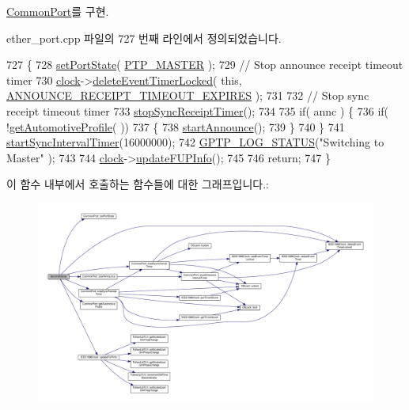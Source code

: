 \hyperlink{class_common_port_a03b0297c9770e83706826350b2815bc1}{Common\+Port}를 구현.



ether\+\_\+port.\+cpp 파일의 727 번째 라인에서 정의되었습니다.


\begin{DoxyCode}
727                                         \{
728     \hyperlink{class_common_port_a8e4a7a3f199cde3540ed0d1ab10386e5}{setPortState}( \hyperlink{ptptypes_8hpp_a679431f1afc75d7bb9e972c022e53672ab4c763cac238b6403615a62111b64aa4}{PTP\_MASTER} );
729     \textcolor{comment}{// Stop announce receipt timeout timer}
730     \hyperlink{class_common_port_aa2bc8731fa5aeb5b033feebc2b67258c}{clock}->\hyperlink{class_i_e_e_e1588_clock_ab3079a65b0509eeb40c2828fa6a7834a}{deleteEventTimerLocked}( \textcolor{keyword}{this}, 
      \hyperlink{ieee1588_8hpp_a5667b805d857c6d28f83f6038a0272d3a7060ecc9be507f5c8828eedf6a163c8b}{ANNOUNCE\_RECEIPT\_TIMEOUT\_EXPIRES} );
731 
732     \textcolor{comment}{// Stop sync receipt timeout timer}
733     \hyperlink{class_common_port_af3b46893f10141406c791c89d3e54b8d}{stopSyncReceiptTimer}();
734 
735     \textcolor{keywordflow}{if}( annc ) \{
736         \textcolor{keywordflow}{if}( !\hyperlink{class_common_port_ad8dc4b5a985b466538d6805970eb0176}{getAutomotiveProfile}( ))
737         \{
738             \hyperlink{class_common_port_a3119c85c0521ef3f23b4a2419684a015}{startAnnounce}();
739         \}
740     \}
741     \hyperlink{class_common_port_a2033d126c19548eb5ada2d623667e1f2}{startSyncIntervalTimer}(16000000);
742     \hyperlink{gptp__log_8hpp_a9bcf107d6f77d335b92bbc4825ea85a3}{GPTP\_LOG\_STATUS}(\textcolor{stringliteral}{"Switching to Master"} );
743 
744     \hyperlink{class_common_port_aa2bc8731fa5aeb5b033feebc2b67258c}{clock}->\hyperlink{class_i_e_e_e1588_clock_aa41be6e57b021a11d16990ba72a69188}{updateFUPInfo}();
745 
746     \textcolor{keywordflow}{return};
747 \}
\end{DoxyCode}


이 함수 내부에서 호출하는 함수들에 대한 그래프입니다.\+:
\nopagebreak
\begin{figure}[H]
\begin{center}
\leavevmode
\includegraphics[width=350pt]{class_ether_port_af952d115c5f8260d7c0006e2236ef6e6_cgraph}
\end{center}
\end{figure}




